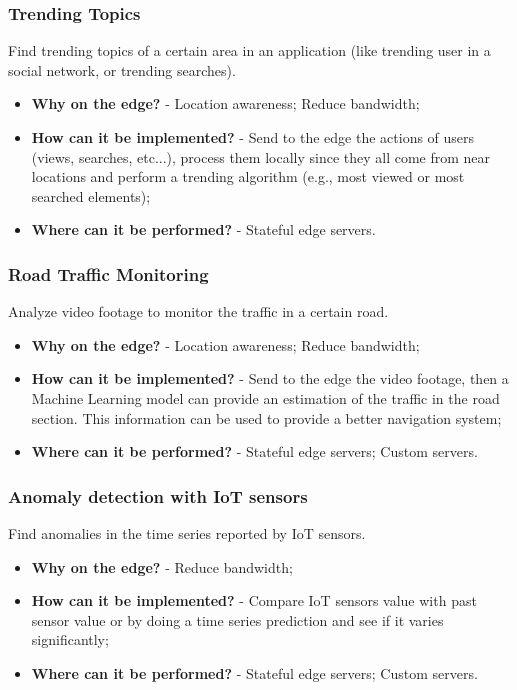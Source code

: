 \subsubsection{Trending Topics}
Find trending topics of a certain area in an application (like trending user in a social network, or trending searches).
\begin{itemize}
    \item \textbf{Why on the edge?} - Location awareness; Reduce bandwidth;
    \item \textbf{How can it be implemented?} - Send to the edge the actions of users (views, searches, etc...), process them locally since they all come from near locations and perform a trending algorithm (e.g., most viewed or most searched elements);
    \item \textbf{Where can it be performed?} - Stateful edge servers.
\end{itemize}


\subsubsection{Road Traffic Monitoring}
Analyze video footage to monitor the traffic in a certain road.
\begin{itemize}
    \item \textbf{Why on the edge?} - Location awareness; Reduce bandwidth;
    \item \textbf{How can it be implemented?} - Send to the edge the video footage, then a Machine Learning model can provide an estimation of the traffic in the road section. This information can be used to provide a better navigation system;
    \item \textbf{Where can it be performed?} - Stateful edge servers; Custom servers.
\end{itemize}


\subsubsection{Anomaly detection with IoT sensors}
Find anomalies in the time series reported by IoT sensors.
\begin{itemize}
    \item \textbf{Why on the edge?} - Reduce bandwidth;
    \item \textbf{How can it be implemented?} - Compare IoT sensors value with past sensor value or by doing a time series prediction and see if it varies significantly;
    \item \textbf{Where can it be performed?} - Stateful edge servers; Custom servers.
\end{itemize}



